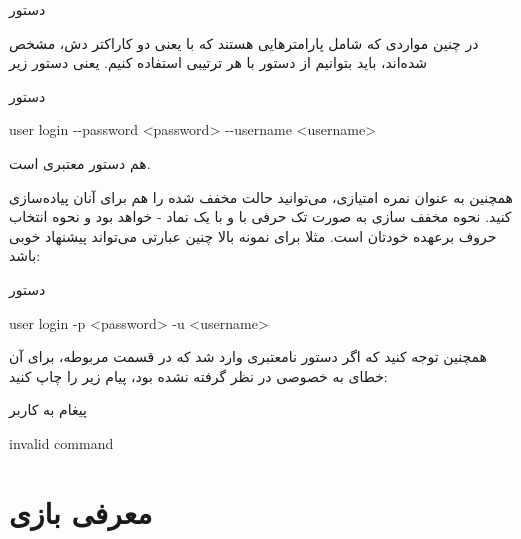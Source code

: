 \documentclass[]{article}
\begin{document}
\begin{enumerate}[label={نکته \arabic*:}]
\begin{mybox}[colback=yellow]{دستور}
\end{mybox}

در چنین مواردی که شامل پارامتر‌هایی هستند که با
\lr{-{}-}
یعنی دو کاراکتر دش، مشخص شده‌اند، باید بتوانیم از دستور با هر ترتیبی استفاده کنیم. یعنی دستور زیر

\begin{mybox}[colback=yellow]{دستور}
	
	
	\begin{latin}
		
		user login -{}-password <password> -{}-username <username> 
		
	\end{latin}
	
\end{mybox}

هم دستور معتبری است.

همچنین به عنوان نمره امتیازی، می‌توانید حالت مخفف شده را هم برای آنان پیاده‌سازی کنید. نحوه مخفف سازی به صورت تک حرفی با و با یک نماد -
خواهد بود و نحوه انتخاب حروف برعهده خودتان است. مثلا برای نمونه بالا چنین عبارتی می‌تواند پیشنهاد خوبی باشد:

\begin{mybox}[colback=yellow]{دستور}
	
	
	\begin{latin}
		
		user login -p <password> -u <username> 
		
	\end{latin}
	
\end{mybox}

همچنین توجه کنید که اگر دستور نامعتبری وارد شد که در قسمت مربوطه، برای آن خطای به خصوصی در نظر گرفته نشده بود، پیام زیر را چاپ کنید:

\begin{mybox}[colback=yellow]{پیغام به کاربر}
	
	
	\begin{latin}
		
	invalid command
		
	\end{latin}
	
\end{mybox}


\end{enumerate}




\newpage


\section*{{\titr معرفی بازی}}
\end{document}
